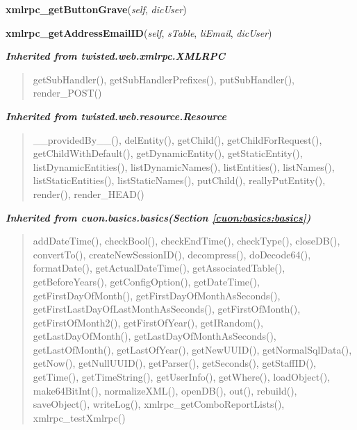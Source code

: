 \hspace{.8\funcindent}\begin{boxedminipage}{\funcwidth}

    \raggedright \textbf{xmlrpc\_getButtonGrave}(\textit{self}, \textit{dicUser})

\setlength{\parskip}{2ex}
\setlength{\parskip}{1ex}
    \end{boxedminipage}

    \label{cuon:Address:Address:xmlrpc_getAddressEmailID}

    \vspace{0.5ex}

\hspace{.8\funcindent}\begin{boxedminipage}{\funcwidth}

    \raggedright \textbf{xmlrpc\_getAddressEmailID}(\textit{self}, \textit{sTable}, \textit{liEmail}, \textit{dicUser})

\setlength{\parskip}{2ex}
\setlength{\parskip}{1ex}
    \end{boxedminipage}


\large{\textbf{\textit{Inherited from twisted.web.xmlrpc.XMLRPC}}}

\begin{quote}
getSubHandler(), getSubHandlerPrefixes(), putSubHandler(), render\_POST()
\end{quote}

\large{\textbf{\textit{Inherited from twisted.web.resource.Resource}}}

\begin{quote}
\_\_providedBy\_\_(), delEntity(), getChild(), getChildForRequest(), getChildWithDefault(), getDynamicEntity(), getStaticEntity(), listDynamicEntities(), listDynamicNames(), listEntities(), listNames(), listStaticEntities(), listStaticNames(), putChild(), reallyPutEntity(), render(), render\_HEAD()
\end{quote}

\large{\textbf{\textit{Inherited from cuon.basics.basics\textit{(Section \ref{cuon:basics:basics})}}}}

\begin{quote}
addDateTime(), checkBool(), checkEndTime(), checkType(), closeDB(), convertTo(), createNewSessionID(), decompress(), doDecode64(), formatDate(), getActualDateTime(), getAssociatedTable(), getBeforeYears(), getConfigOption(), getDateTime(), getFirstDayOfMonth(), getFirstDayOfMonthAsSeconds(), getFirstLastDayOfLastMonthAsSeconds(), getFirstOfMonth(), getFirstOfMonth2(), getFirstOfYear(), getIRandom(), getLastDayOfMonth(), getLastDayOfMonthAsSeconds(), getLastOfMonth(), getLastOfYear(), getNewUUID(), getNormalSqlData(), getNow(), getNullUUID(), getParser(), getSeconds(), getStaffID(), getTime(), getTimeString(), getUserInfo(), getWhere(), loadObject(), make64BitInt(), normalizeXML(), openDB(), out(), rebuild(), saveObject(), writeLog(), xmlrpc\_getComboReportLists(), xmlrpc\_testXmlrpc()
\end{quote}

